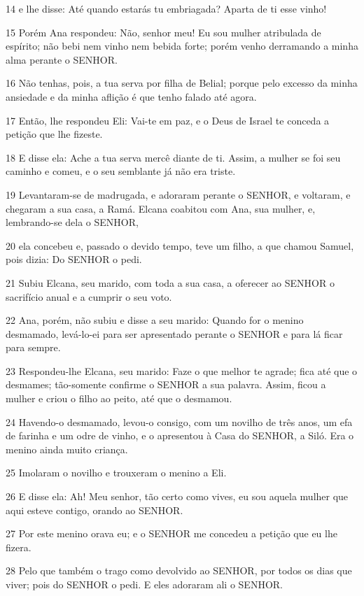 \par 14 e lhe disse: Até quando estarás tu embriagada? Aparta de ti esse vinho!
\par 15 Porém Ana respondeu: Não, senhor meu! Eu sou mulher atribulada de espírito; não bebi nem vinho nem bebida forte; porém venho derramando a minha alma perante o SENHOR.
\par 16 Não tenhas, pois, a tua serva por filha de Belial; porque pelo excesso da minha ansiedade e da minha aflição é que tenho falado até agora.
\par 17 Então, lhe respondeu Eli: Vai-te em paz, e o Deus de Israel te conceda a petição que lhe fizeste.
\par 18 E disse ela: Ache a tua serva mercê diante de ti. Assim, a mulher se foi seu caminho e comeu, e o seu semblante já não era triste.
\par 19 Levantaram-se de madrugada, e adoraram perante o SENHOR, e voltaram, e chegaram a sua casa, a Ramá. Elcana coabitou com Ana, sua mulher, e, lembrando-se dela o SENHOR,
\par 20 ela concebeu e, passado o devido tempo, teve um filho, a que chamou Samuel, pois dizia: Do SENHOR o pedi.
\par 21 Subiu Elcana, seu marido, com toda a sua casa, a oferecer ao SENHOR o sacrifício anual e a cumprir o seu voto.
\par 22 Ana, porém, não subiu e disse a seu marido: Quando for o menino desmamado, levá-lo-ei para ser apresentado perante o SENHOR e para lá ficar para sempre.
\par 23 Respondeu-lhe Elcana, seu marido: Faze o que melhor te agrade; fica até que o desmames; tão-somente confirme o SENHOR a sua palavra. Assim, ficou a mulher e criou o filho ao peito, até que o desmamou.
\par 24 Havendo-o desmamado, levou-o consigo, com um novilho de três anos, um efa de farinha e um odre de vinho, e o apresentou à Casa do SENHOR, a Siló. Era o menino ainda muito criança.
\par 25 Imolaram o novilho e trouxeram o menino a Eli.
\par 26 E disse ela: Ah! Meu senhor, tão certo como vives, eu sou aquela mulher que aqui esteve contigo, orando ao SENHOR.
\par 27 Por este menino orava eu; e o SENHOR me concedeu a petição que eu lhe fizera.
\par 28 Pelo que também o trago como devolvido ao SENHOR, por todos os dias que viver; pois do SENHOR o pedi. E eles adoraram ali o SENHOR.

